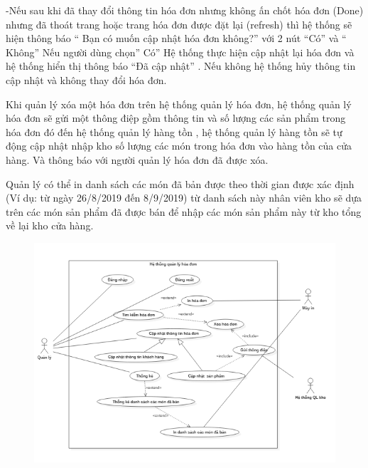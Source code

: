 \documentclass{article}
\begin{document}
-Nếu sau khi đã thay đổi thông tin hóa đơn nhưng không ấn chốt hóa đơn (Done) nhưng đã thoát trang hoặc trang hóa đơn được đặt lại (refresh)  thì hệ thống sẽ hiện thông báo “ Bạn có muốn cập nhật hóa đơn không?” với 2 nút “Có” và “ Không”
Nếu người dùng chọn” Có” Hệ thống thực hiện cập nhật lại hóa đơn và hệ thống hiển thị thông báo “Đã cập nhật” . Nếu không hệ thống hủy thông tin cập nhật và không thay đổi hóa đơn.

Khi quản lý xóa một hóa đơn trên hệ thống quản lý hóa đơn, hệ thống quản lý hóa đơn sẽ gửi một thông điệp gồm thông tin và số lượng các sản phẩm trong hóa đơn đó đến hệ thống quản lý hàng tồn , hệ thống quản lý hàng tồn sẽ tự động cập nhật  nhập kho số lượng các món trong hóa đơn vào hàng tồn của cửa hàng. Và thông báo với người quản lý hóa đơn đã được xóa.

Quản lý có thể in danh sách các món đã bản được theo thời gian được xác định (Ví dụ: từ ngày 26/8/2019 đến 8/9/2019) từ  danh sách này nhân viên kho sẽ dựa trên các món sản phẩm đã được bán để nhập các món sản phẩm này từ kho tổng về lại kho cửa hàng.
    \begin{figure}
        \centering
        \includegraphics{5.png}
    \end{figure}
\end{document}
